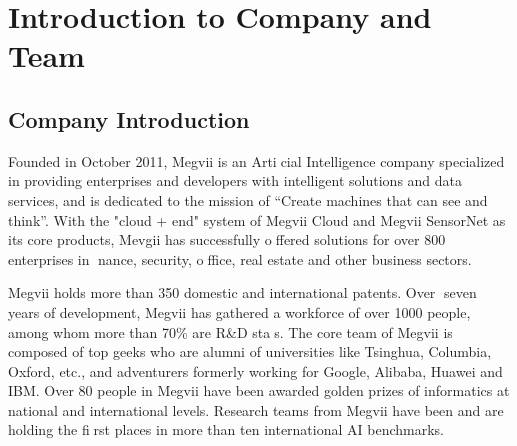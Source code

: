 \chapter{Introduction to Company and Team}
\label{sec:intro}

\section{Company Introduction}
\label{sec:isauriam}

Founded in October 2011, Megvii is an Articial Intelligence company specialized in providing enterprises and developers with intelligent solutions and data services,
and is dedicated to the mission of “Create machines that can see and think”.
With the "cloud + end" system of Megvii Cloud and Megvii SensorNet as its core products, Mevgii has successfully offered solutions for over 800 enterprises in nance, security,
office, real estate and other business sectors.

Megvii holds more than 350 domestic and international patents. Over seven years of development, Megvii has gathered a workforce of over 1000 people, among whom more than 70\% are R&D stas. The core team of Megvii is composed of top geeks
who are alumni of universities like Tsinghua, Columbia, Oxford, etc., and adventurers formerly working for Google, Alibaba, Huawei and IBM.
Over 80 people in Megvii have been awarded golden prizes of informatics at national and international levels.
Research teams from Megvii have been and are holding the first places in more than ten international AI benchmarks.

